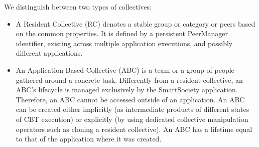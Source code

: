 We distinguish between two types of collectives: 
\begin{itemize}
\item A Resident Collective (RC) denotes a stable group or category or peers based on the common properties. It is defined by a persistent PeerManager identifier, existing across multiple application executions, and possibly different applications. 
\item An Application-Based Collective (ABC) is a team or a group of people gathered around a concrete task. Differently from a resident collective, an ABC's lifecycle is managed exclusively by the SmartSociety application. Therefore, an ABC cannot be accessed outside of an application. An ABC can be created either implicitly (as intermediate products of different states of CBT execution) or explicitly (by using dedicated collective manipulation operators such as cloning a resident collective). An ABC has a lifetime equal to that of the application where it was created.
\end{itemize}
